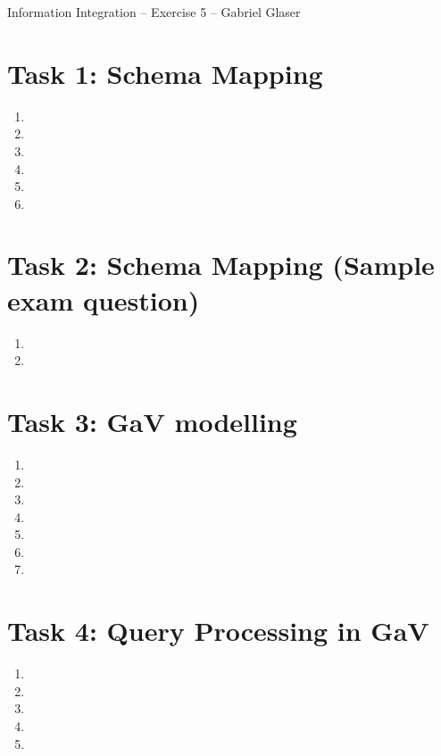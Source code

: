 \documentclass{scrartcl}
\begin{document}
	\begin{center}
		\LARGE
		Information Integration -- Exercise 5 -- Gabriel Glaser
	\end{center}
	
	\section*{Task 1: Schema Mapping}
	\begin{enumerate}
		\item 
		
		\item 
		
		\item 
		
		\item 
		
		\item 
		
		\item 
	\end{enumerate}
	
	\section*{Task 2: Schema Mapping (Sample exam question)}
	\begin{enumerate}
		\item 
		
		\item 
	\end{enumerate}
	
	\section*{Task 3: GaV modelling}
	\begin{enumerate}
		\item 
		
		\item 
		
		\item 
		
		\item 
		
		\item 
		
		\item 
		
		\item 
	\end{enumerate}
	
	\section*{Task 4: Query Processing in GaV}
	\begin{enumerate}
		\item 
		
		\item 
		
		\item 
		
		\item 
		
		\item 
	\end{enumerate}
\end{document}
